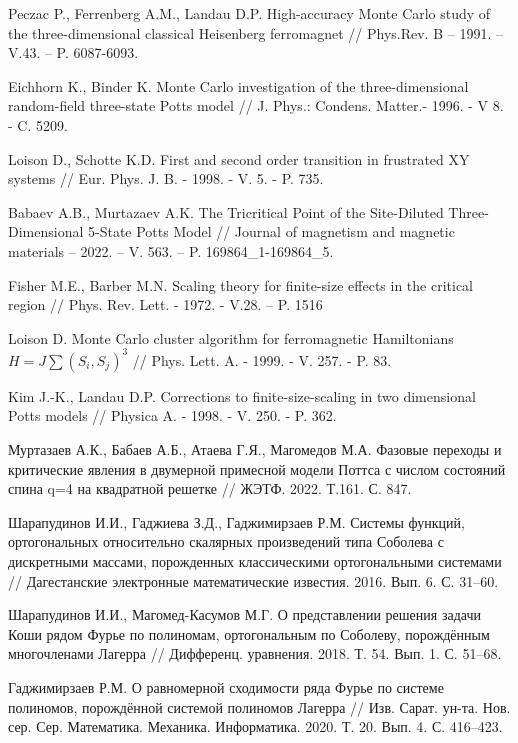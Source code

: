 \begin{thebibliography}{111}
Peczac P., Ferrenberg A.M., Landau D.P. High-accuracy Monte Carlo study of the three-dimensional classical Heisenberg ferromagnet // Phys.Rev. B -- 1991. --V.43. -- P. 6087-6093.

Eichhorn K., Binder K. Monte Carlo investigation of the three-dimensional random-field three-state Potts model // J. Phys.: Condens. Matter.- 1996. - V 8. - C. 5209.

Loison D., Schotte K.D. First and second order transition in frustrated XY systems // Eur. Phys. J. B. - 1998. - V. 5. - P. 735.

Babaev A.B., Murtazaev A.K. The Tricritical Point of the Site-Diluted Three-Dimensional 5-State Potts Model // Journal of magnetism and magnetic materials -- 2022. -- V. 563. -- P. 169864\_1-169864\_5.

Fisher M.E., Barber M.N. Scaling theory for finite-size effects in the critical region // Phys. Rev. Lett. - 1972. - V.28. -- P. 1516

Loison D. Monte Carlo cluster algorithm for ferromagnetic Hamiltonians $H = J\sum(S_i, S_j)^3$ // Phys. Lett. A. - 1999. - V. 257. - P. 83.

Kim J.-K., Landau D.P. Corrections to finite-size-scaling in two dimensional Potts models // Physica A. - 1998. - V. 250. - P. 362.

Муртазаев А.К., Бабаев А.Б., Атаева Г.Я., Магомедов М.А. Фазовые переходы и критические явления в двумерной примесной модели Поттса с числом состояний спина q=4 на квадратной решетке // ЖЭТФ. 2022. Т.161. С. 847.


{Шарапудинов И.И., Гаджиева З.Д., Гаджимирзаев Р.М.} Системы функций, ортогональных относительно скалярных произведений типа Соболева с дискретными массами, порожденных классическими ортогональными системами // Дагестанские электронные математические известия. 2016. Вып. 6. С. 31--60.

{Шарапудинов И.И., Магомед-Касумов М.Г.} О представлении решения задачи Коши рядом Фурье по полиномам, ортогональным по Соболеву, порождённым многочленами Лагерра // Дифференц. уравнения. 2018. Т. 54. Вып. 1. С. 51--68.

{Гаджимирзаев Р.М.} О равномерной сходимости ряда Фурье по системе полиномов, порождённой системой полиномов Лагерра // Изв. Сарат. ун-та. Нов. сер. Сер. Математика. Механика. Информатика. 2020. Т. 20. Вып. 4. С. 416--423.



\end{thebibliography}
